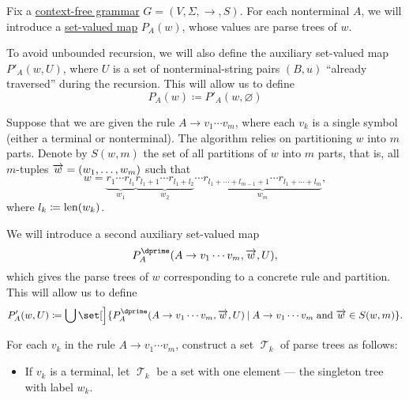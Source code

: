 \begin{algorithm}\label{alg:brute_force_parsing}
  Fix a \hyperref[def:chomsky_hierarchy/context_free]{context-free grammar} \( G = (V, \Sigma, \to, S) \). For each nonterminal \( A \), we will introduce a \hyperref[def:function]{set-valued map} \( P_A(w) \), whose values are parse trees of \( w \).

  To avoid unbounded recursion, we will also define the auxiliary set-valued map \( P'_A(w, U) \), where \( U \) is a set of nonterminal-string pairs \( (B, u) \) \enquote{already traversed} during the recursion. This will allow us to define
  \begin{equation*}
    P_A(w)
    \coloneqq
    P'_A(w, \varnothing)
  \end{equation*}

  Suppose that we are given the rule \( A \to v_1 \cdots v_m \), where each \( v_k \) is a single symbol (either a terminal or nonterminal). The algorithm relies on partitioning \( w \) into \( m \) parts. Denote by \( S(w, m) \) the set of all partitions of \( w \) into \( m \) parts, that is, all \( m \)-tuples \( \overrightarrow{w} = (w_1, \ldots, w_m) \) such that
  \begin{equation*}
    w = \underbrace{ r_1 \cdots r_{l_1} }_{w_1} \underbrace{ r_{l_1 + 1} \cdots r_{l_1 + l_2} }_{w_2} \cdots \underbrace{ r_{l_1 + \cdots + l_{m-1} + 1} \cdots r_{l_1 + \cdots + l_m} }_{w_m},
  \end{equation*}
  where \( l_k \coloneqq \operatorname{len}(w_k) \).

  We will introduce a second auxiliary set-valued map
  \begin{equation*}
    P^\dprime_A(A \to v_1 \cdots v_m, \vect w, U),
  \end{equation*}
  which gives the parse trees of \( w \) corresponding to a concrete rule and partition. This will allow us to define
  \begin{equation*}
    P'_A(w, U)
    \coloneqq
    \bigcup\set[\Big]{ P^\dprime_A(A \to v_1 \cdots v_m, \vect w, U) \given A \to v_1 \cdots v_m \T{and} \vect w \in S(w, m) }.
  \end{equation*}

  \begin{thmenum}
     For each \( v_k \) in the rule \( A \to v_1 \cdots v_m \), construct a set \( \mscrT_k \) of parse trees as follows:
    \begin{itemize}
      \item If \( v_k \) is a terminal, let \( \mscrT_k \) be a set with one element --- the singleton tree with label \( w_k \).


\end{itemize}
\end{thmenum}
\end{algorithm}
